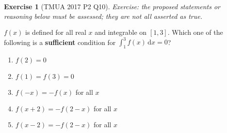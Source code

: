 \documentclass[11pt]{article}
\theoremstyle{definition}
\newtheorem{example}[theorem]{Exercise}
\theoremstyle{remark}
\newcommand{\pqty}[1]{\left(#1\right)}
\newcommand{\dd}[1]{\,\mathrm{d}#1}
\begin{document}
\begin{example}[TMUA 2017 P2 Q10]\label{tmua-4-unit-033}
\textit{Exercise: the proposed statements or reasoning below must be assessed; they are not all asserted as true.}\par

    \(f\pqty{x}\) is defined for all real \(x\) and integrable on \([1,3]\). Which one of the following is a \textbf{sufficient} condition for \(\int_{1}^{3} f\pqty{x} \dd{x} = 0\)?
    
    \begin{enumerate}[label=\Alph*.]
        \item \(f\pqty{2} = 0\)
        \item \(f\pqty{1} = f\pqty{3} = 0\)
        \item \(f\pqty{-x} = - f \pqty{x}\) for all \(x\)
        \item \(f\pqty{x + 2} = - f \pqty{2 - x}\) for all \(x\)
        \item \(f\pqty{x - 2} = - f \pqty{2 - x}\) for all \(x\)
    \end{enumerate}
\end{example}
\end{document}
